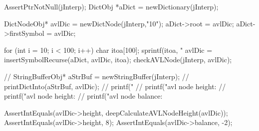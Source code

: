 \startCTest
  AssertPtrNotNull(jInterp);
  DictObj *aDict = newDictionary(jInterp);

  DictNodeObj* avlDic = newDictNode(jInterp,"10");
  aDict->root         = avlDic;
  aDict->firstSymbol  = avlDic;

  for (int i = 10; i < 100; i++) {
    char itoa[100];
    sprintf(itoa, "%
    avlDic = insertSymbolRecurse(aDict, avlDic, itoa);
  }
  checkAVLNode(jInterp, avlDic);

//  StringBufferObj* aStrBuf = newStringBuffer(jInterp);
//  printDictInto(aStrBuf, avlDic);
//  printf("%
//  printf("avl node height: %
//  printf("avl node height: %
//  printf("avl node balance: %

  AssertIntEquals(avlDic->height, deepCalculateAVLNodeHeight(avlDic));
  AssertIntEquals(avlDic->height, 8);
  AssertIntEquals(avlDic->balance, -2);
\stopCTest
\stopTestCase
\stopTestSuite